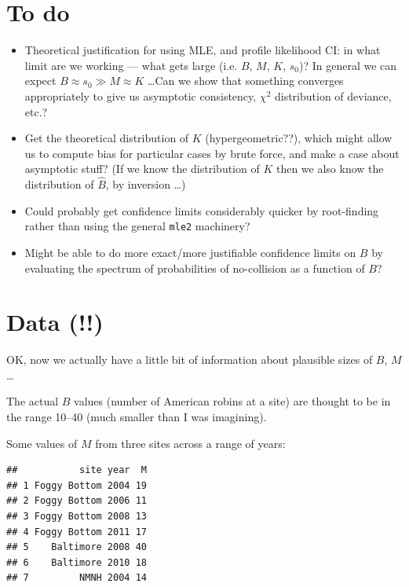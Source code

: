 \documentclass{article}\usepackage[]{graphicx}\usepackage[]{color}
\makeatletter
\newenvironment{kframe}{%
 \def\at@end@of@kframe{}%
 \ifinner\ifhmode%
  \def\at@end@of@kframe{\end{minipage}}%
  \begin{minipage}{\columnwidth}%
 \fi\fi%
 \def\FrameCommand##1{\hskip\@totalleftmargin \hskip-\fboxsep
 \colorbox{shadecolor}{##1}\hskip-\fboxsep
     \hskip-\linewidth \hskip-\@totalleftmargin \hskip\columnwidth}%
 \MakeFramed {\advance\hsize-\width
   \@totalleftmargin\z@ \linewidth\hsize
   \@setminipage}}%
 {\par\unskip\endMakeFramed%
 \at@end@of@kframe}
\newenvironment{knitrout}{}{} %
\newcommand{\code}[1]{{\tt #1}}
\makeatother
\begin{document}
\section{To do}

\begin{itemize}
  \item Theoretical justification for using MLE, and
    profile likelihood CI: in what limit are we working --- what
    gets large (i.e. $B$, $M$, $K$, $s_0$)?  In general we can
    expect $B \approx s_0 \gg M \approx K$ \ldots  Can we show
    that something converges appropriately to give us 
    asymptotic consistency, $\chi^2$ distribution of deviance,
    etc.?  
  \item Get the theoretical distribution
    of $K$ (hypergeometric??), which might allow us to compute bias
    for particular cases by brute force, and make a case about
    asymptotic stuff?  (If we know the distribution of $K$ then
    we also know the distribution of $\hat B$, by inversion \ldots)
  \item Could probably get confidence limits considerably quicker
    by root-finding rather than using the general \code{mle2}
    machinery?
  \item Might be able to do more exact/more justifiable confidence
    limits on $B$ by evaluating the spectrum of probabilities of
    no-collision as a function of $B$?
\end{itemize}

\section{Data (!!)}

OK, now we actually have a little bit of information about
plausible sizes of $B$, $M$ \ldots

The actual $B$ values (number of American robins at a site)
are thought to be in the range 10--40
(much smaller than I was imagining).

Some values of $M$ from three sites across a range of years:
\begin{knitrout}
\color{fgcolor}\begin{kframe}
\begin{verbatim}
##           site year  M
## 1 Foggy Bottom 2004 19
## 2 Foggy Bottom 2006 11
## 3 Foggy Bottom 2008 13
## 4 Foggy Bottom 2011 17
## 5    Baltimore 2008 40
## 6    Baltimore 2010 18
## 7         NMNH 2004 14
\end{verbatim}
\end{kframe}
\end{knitrout}
\end{document}
